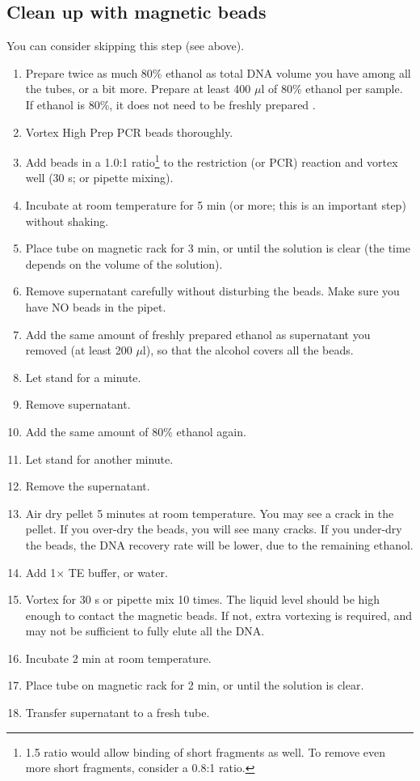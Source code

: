 \documentclass[a4paper,12pt]{article}
\begin{document}
\subsection{Clean up with magnetic beads}
You can consider skipping this step (see above).
\begin{enumerate}
\item Prepare twice as much 80\% ethanol as total DNA volume you have among all the tubes, or a bit more. Prepare at least 400 $\mu$l of 80\% ethanol per sample. If ethanol is 80\%, it does not need to be freshly prepared \cite{Bronner2009}.
\item Vortex High Prep PCR beads thoroughly.
\item Add beads in a 1.0:1 ratio\footnote{1.5 ratio would allow binding of short fragments as well. To remove even more short fragments, consider a 0.8:1 ratio.} to the restriction (or PCR) reaction and vortex well (30 s; or pipette mixing).
\item Incubate at room temperature for 5 min (or more; this is an important step) without shaking.
\item Place tube on magnetic rack for 3 min, or until the solution is clear (the time depends on the volume of the solution).
\item Remove supernatant carefully without disturbing the beads. Make sure you have NO beads in the pipet.
\item Add the same amount of freshly prepared ethanol as supernatant you removed (at least 200 $\mu$l), so that the alcohol covers all the beads.
\item Let stand for a minute.
\item Remove supernatant.
\item Add the same amount of 80\% ethanol again.
\item Let stand for another minute.
\item Remove the supernatant.
\item Air dry pellet 5 minutes at room temperature. You may see a crack in the pellet. If you over-dry the beads, you will see many cracks. If you under-dry the beads, the DNA recovery rate will be lower, due to the remaining ethanol. 
\item Add 1$\times$ TE buffer, or water.
\item Vortex for 30 s or pipette mix 10 times. The liquid level should be high enough to contact the magnetic beads. If not, extra vortexing is required, and may not be sufficient to fully elute all the DNA.
\item Incubate 2 min at room temperature.
\item Place tube on magnetic rack for 2 min, or until the solution is clear.
\item Transfer supernatant to a fresh tube.
\end{enumerate}
\end{document}
